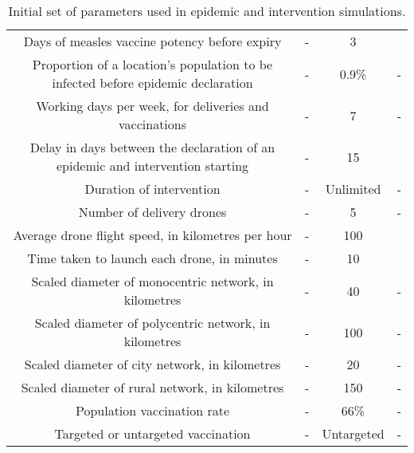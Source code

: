 \documentclass[10pt,letterpaper]{article}
\begin{document}
\begin{table}[ht!]
{\begin{tabular}{|c|c|c|c|}
Days of measles vaccine potency before expiry                                    & -             & 3                & \cite{msf_ectc_2018} \\
Proportion of a location's population to be infected before epidemic declaration & -             & 0.9\%             & - \\
Working days per week, for deliveries and vaccinations                           & -             & 7                & - \\
Delay in days between the declaration of an epidemic and intervention starting   & -             & 15               & \cite{grais2006exploring} \\
Duration of intervention                                                     & -             & Unlimited        & - \\
Number of delivery drones                                                                 & -             & 5       & -  \\
Average drone flight speed, in kilometres per hour                               & -             & 100              & \cite{zipline_impact} \\
Time taken to launch each drone, in minutes                                        & -             & 10             & \cite{ackerman_koziol_2019}  \\
Scaled diameter of monocentric network, in kilometres                                       & -             & 40               & -   \\
Scaled diameter of polycentric network, in kilometres                                         & -             & 100              & -     \\
Scaled diameter of city network, in kilometres                                                & -             & 20               & -   \\
Scaled diameter of rural network, in kilometres                                               & -             & 150              & -    \\
Population vaccination rate                                                   & -             & 66\%             & - \\
Targeted or untargeted vaccination                                 & -             & Untargeted       & - \\ \hline
\end{tabular}%
}
\caption{Initial set of parameters used in epidemic and intervention simulations.}
\label{tab:initial_params}
\end{table}
\end{document}
